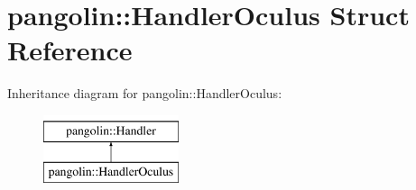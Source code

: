 \hypertarget{structpangolin_1_1_handler_oculus}{}\section{pangolin\+:\+:Handler\+Oculus Struct Reference}
\label{structpangolin_1_1_handler_oculus}
Inheritance diagram for pangolin\+:\+:Handler\+Oculus\+:\begin{figure}[H]
\begin{center}
\leavevmode
\includegraphics[height=2.000000cm]{structpangolin_1_1_handler_oculus}
\end{center}
\end{figure}
